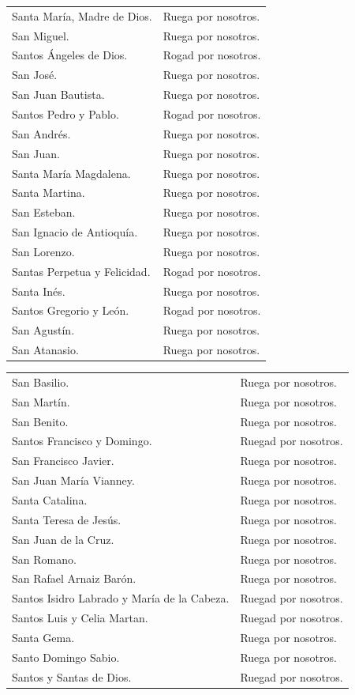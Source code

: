 \documentclass[12pt, letterpaper]{report}
\begin{document}
\begin{tabular}{ll}
Santa Mar\'ia, Madre de Dios.& Ruega por nosotros. \\
San Miguel.& Ruega por nosotros. \\
Santos \'Angeles de Dios.& Rogad por nosotros. \\
San Jos\'e.& Ruega por nosotros. \\
San Juan Bautista.& Ruega por nosotros. \\
Santos Pedro y Pablo.& Rogad por nosotros. \\
San Andr\'es.& Ruega por nosotros. \\
San Juan.& Ruega por nosotros. \\
Santa Mar\'ia Magdalena.& Ruega por nosotros. \\
Santa Martina.& Ruega por nosotros. \\
San Esteban.& Ruega por nosotros. \\
San Ignacio de Antioqu\'ia.& Ruega por nosotros. \\
San Lorenzo.& Ruega por nosotros. \\
Santas Perpetua y Felicidad.& Rogad por nosotros. \\
Santa In\'es.& Ruega por nosotros. \\
Santos Gregorio y Le\'on.& Rogad por nosotros. \\
San Agust\'in.& Ruega por nosotros. \\
San Atanasio.& Ruega por nosotros.
\end{tabular}

\begin{tabular}{ll}
San Basilio.& Ruega por nosotros. \\
San Mart\'in.& Ruega por nosotros. \\
San Benito.& Ruega por nosotros. \\
Santos Francisco y Domingo.& Ruegad por nosotros. \\
San Francisco Javier.& Ruega por nosotros. \\
San Juan Mar\'ia Vianney.& Ruega por nosotros. \\
Santa Catalina.& Ruega por nosotros. \\
Santa Teresa de Jes\'us.& Ruega por nosotros. \\
San Juan de la Cruz.& Ruega por nosotros. \\
San Romano.& Ruega por nosotros. \\
San Rafael Arnaiz Bar\'on.& Ruega por nosotros. \\
Santos Isidro Labrado y Mar\'ia de la Cabeza.& Ruegad por nosotros. \\
Santos Luis y Celia Martan.& Ruegad por nosotros. \\
Santa Gema.& Ruega por nosotros. \\
Santo Domingo Sabio.& Ruega por nosotros. \\
Santos y Santas de Dios.& Ruegad por nosotros.
\end{tabular} \newline \\
\end{document}
